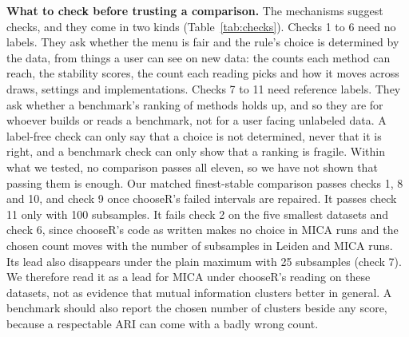 \textbf{What to check before trusting a comparison.} The mechanisms suggest checks, and they come in two
kinds (Table~\ref{tab:checks}). Checks 1 to 6 need no labels. They ask whether the menu is fair and the
rule's choice is determined by the data, from things a user can see on new data: the counts each method can reach, the
stability scores, the count each reading picks and how it moves across draws, settings and
implementations. Checks 7 to 11 need reference labels. They ask whether a benchmark's ranking of methods
holds up, and so they are for whoever builds or reads a benchmark, not for a user facing unlabeled data. A
label-free check can only say that a choice is not determined, never that it is right, and a benchmark
check can only show that a ranking is fragile. Within what we tested, no comparison passes all eleven, so
we have not shown that passing them is enough. Our matched finest-stable comparison passes checks 1, 8 and
10, and check 9 once chooseR's failed intervals are repaired. It passes check 11 only with 100 subsamples.
It fails check 2 on the five smallest datasets and check 6, since chooseR's code as written makes no choice
in  MICA runs and the chosen count moves with the number of subsamples in  Leiden and
 MICA runs. Its lead also disappears under the plain maximum with 25 subsamples (check 7). We therefore read it as a lead for MICA under chooseR's reading on
these datasets, not as evidence that mutual information clusters better in general. A benchmark should also
report the chosen number of clusters beside any score, because a respectable ARI can come with a badly
wrong count.


